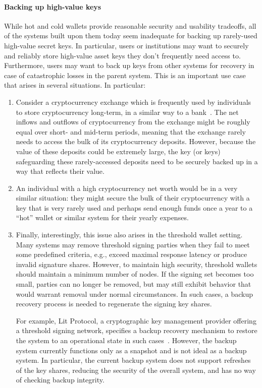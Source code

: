 \paragraph{Backing up high-value keys} While hot and cold wallets provide reasonable security and usability tradeoffs, all of the systems built upon them today seem inadequate for backing up rarely-used high-value secret keys. 
In particular, users or institutions may want to securely and reliably store high-value asset keys they don't frequently need access to. Furthermore, users may want to back up keys from other systems for recovery in case of catastrophic losses in the parent system. This is an important use case that arises in several situations. In particular:
\begin{enumerate}
\item Consider a cryptocurrency exchange which is frequently used by individuals to store cryptocurrency long-term, in a similar way to a bank~\cite{coinbase-philosophy,coinbase-deposits,kraken-security}. 
 The net inflows and outflows of cryptocurrency from the exchange might be roughly equal over short- and mid-term periods, meaning that the exchange rarely needs to access the bulk of its cryptocurrency deposits.  However, because the value of these deposits could be extremely large, the key (or keys) safeguarding these rarely-accessed deposits need to be securely backed up in a way that reflects their value.

 \item An individual with a high cryptocurrency net worth would be in a very similar situation:  they might secure the bulk of their cryptocurrency with a key that is very rarely used and perhaps send enough funds once a year to a ``hot'' wallet or similar system for their yearly expenses.

\item Finally, interestingly, this issue also arises in the threshold wallet setting. Many systems may remove threshold signing parties when they fail to meet some predefined criteria, e.g., exceed maximal response latency or produce invalid signature shares. However, to maintain high security, threshold wallets should maintain a minimum number of nodes. If the signing set becomes too small, parties can no longer be removed, but may still exhibit behavior that would warrant removal under normal circumstances. In such cases, a backup recovery process is needed to regenerate the signing key shares.

For example, Lit Protocol, a cryptographic key management provider offering a threshold signing network, specifies a backup recovery mechanism to restore the system to an operational state in such cases~\cite{lit-whitepaper}. However, the backup system currently functions only as a snapshot and is not ideal as a backup system. In particular, the current backup system does not support refreshes of the key shares, reducing the security of the overall system, and has no way of checking backup integrity. %
\end{enumerate}

